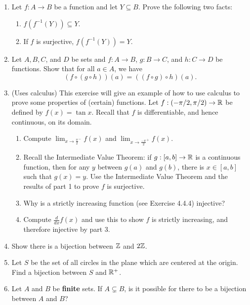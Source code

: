 \begin{exercises}
\begin{enumerate}
\item Let $f : A \to B$ be a function and let $Y \subseteq B$. Prove the following two facts:
\begin{enumerate}
    \item $f(f^{-1}(Y)) \subseteq Y$.
    \item If $f$ is surjective, $f(f^{-1}(Y)) = Y$.
\end{enumerate}

\item Let $A,B,C$, and $D$ be sets and $f : A \to B$, $g : B \to C$, and $h : C \to D$ be functions. Show that for all $a \in A$, we have
\[
(f \circ (g \circ h))(a) = ((f \circ g) \circ h)(a).
\]

\item (Uses calculus) This exercise will give an example of how to use calculus to prove some properties of (certain) functions. Let $f : (-\pi/2,\pi/2) \to \mathbb{R}$ be defined by $f(x) = \tan x$. Recall that $f$ is differentiable, and hence continuous, on its domain.
\begin{enumerate}
    \item Compute $\lim_{x \to \frac{\pi}{2}^-} f(x)$ and $\lim_{x \to \frac{-\pi}{2}^+} f(x)$.
    \item Recall the Intermediate Value Theorem: if $g : [a,b] \to \mathbb{R}$ is a continuous function, then for any $y$ between $g(a)$ and $g(b)$, there is $x \in [a,b]$ such that $g(x) = y$. Use the Intermediate Value Theorem and the results of part 1 to prove $f$ is surjective.
    \item Why is a strictly increasing function (see Exercise 4.4.4) injective? 
    \item Compute $\frac{d}{dx}f(x)$ and use this to show $f$ is strictly increasing, and therefore injective by part 3.
\end{enumerate}

\item Show there is a bijection between $\mathbb{Z}$ and $2\mathbb{Z}$.

\item Let $S$ be the set of all circles in the plane which are centered at the origin. Find a bijection between $S$ and $\mathbb{R}^+$.

\item Let $A$ and $B$ be \textbf{finite} sets. If $A \subsetneq B$, is it possible for there to be a bijection between $A$ and $B$?
\end{enumerate}

\end{exercises}

